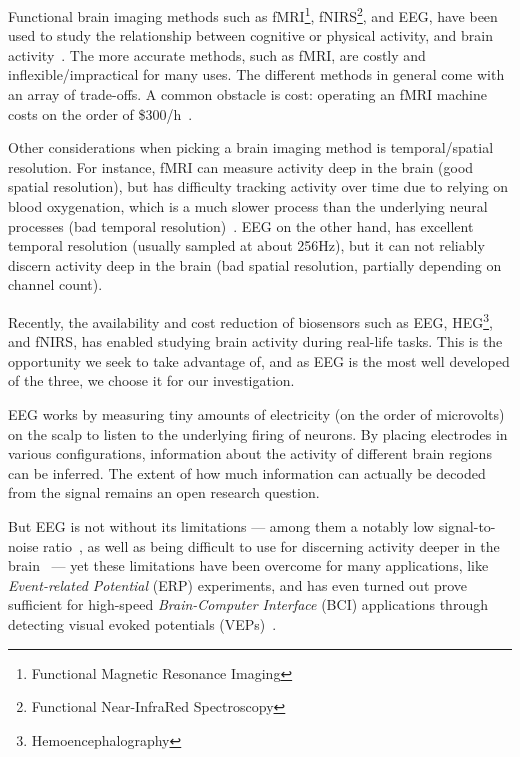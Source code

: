     Functional brain imaging methods such as fMRI\footnote{Functional Magnetic Resonance Imaging}, fNIRS\footnote{Functional Near-InfraRed Spectroscopy}, and EEG, have been used to study the relationship between cognitive or physical activity, and brain activity~\cite{floyd_decoding_2017}\cite{hong_classification_2015}\cite{fucci_replication_2019}. The more accurate methods, such as fMRI, are costly and inflexible/impractical for many uses. The different methods in general come with an array of trade-offs. A common obstacle is cost: operating an fMRI machine costs on the order of \$300/h~\cite{fucci_replication_2019}. 

    Other considerations when picking a brain imaging method is temporal/spatial resolution. For instance, fMRI can measure activity deep in the brain (good spatial resolution), but has difficulty tracking activity over time due to relying on blood oxygenation, which is a much slower process than the underlying neural processes (bad temporal resolution)~\cite{glover_overview_2011}. EEG on the other hand, has excellent temporal resolution (usually sampled at about 256Hz), but it can not reliably discern activity deep in the brain (bad spatial resolution, partially depending on channel count).

    Recently, the availability and cost reduction of biosensors such as EEG, HEG\footnote{Hemoencephalography}, and fNIRS, has enabled studying brain activity during real-life tasks. This is the opportunity we seek to take advantage of, and as EEG is the most well developed of the three, we choose it for our investigation.

    EEG works by measuring tiny amounts of electricity (on the order of microvolts) on the scalp to listen to the underlying firing of neurons. By placing electrodes in various configurations, information about the activity of different brain regions can be inferred. The extent of how much information can actually be decoded from the signal remains an open research question.

    But EEG is not without its limitations --- among them a notably low signal-to-noise ratio~\cite{mcfarland_eeg-based_2017}, as well as being difficult to use for discerning activity deeper in the brain~\cite{fahimi_hnazaee_localization_2020} --- yet these limitations have been overcome for many applications, like \emph{Event-related Potential} (ERP) experiments, and has even turned out prove sufficient for high-speed \emph{Brain-Computer Interface} (BCI) applications through detecting visual evoked potentials (VEPs)~\cite{spuler_high-speed_2017}.

